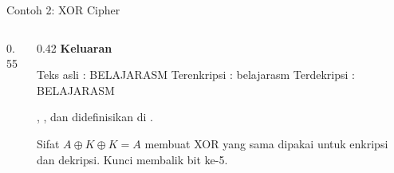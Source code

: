 \documentclass[aspectratio=169,11pt]{beamer}
\begin{document}
\begin{frame}[fragile]{Contoh 2: XOR Cipher}
\begin{columns}[t]
\begin{column}{0.55\textwidth}
\end{column}
\begin{column}{0.42\textwidth}
\footnotesize
{\color{obeTeal}\bfseries Keluaran}\\[0.15em]
\begin{keluaran}
Teks asli    : BELAJARASM
Terenkripsi  : belajarasm
Terdekripsi  : BELAJARASM
\end{keluaran}

\vspace{0.2em}
{\footnotesize\color{obeGray}, , dan
 didefinisikan di .\par}

\vspace{0.2em}
Sifat $A \oplus K \oplus K = A$ membuat XOR yang sama dipakai untuk
enkripsi dan dekripsi. Kunci  membalik bit ke-5.
\end{column}
\end{columns}
\end{frame}
\end{document}
